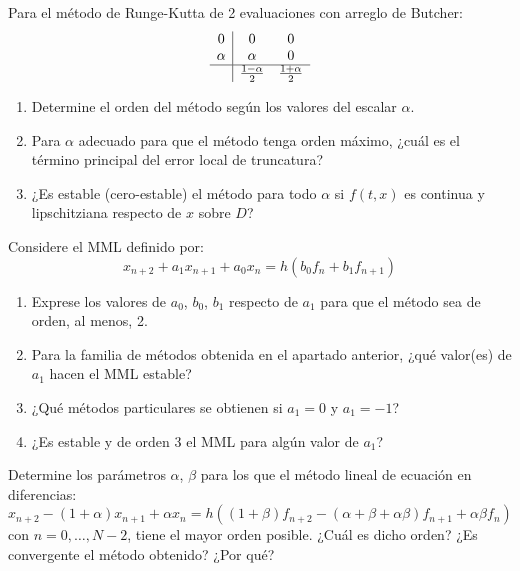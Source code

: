 \begin{ejercicio}\label{ej:3.1.10}
    Para el método de Runge-Kutta de 2 evaluaciones con arreglo de Butcher:
    \begin{equation*}
        \begin{array}{c|cc}
            0 & 0 & 0 \\ 
            \alpha & \alpha & 0 \\ \hline
             & \frac{1-\alpha}{2} & \frac{1+\alpha}{2}
        \end{array}
    \end{equation*}
    \begin{enumerate}
        \item Determine el orden del método según los valores del escalar $\alpha$.
        \item Para $\alpha$ adecuado para que el método tenga orden máximo, ¿cuál es el término principal del error local de truncatura?
        \item ¿Es estable (cero-estable) el método para todo $\alpha$ si $f(t, x)$ es continua y lipschitziana respecto de $x$ sobre $D$?
    \end{enumerate}
\end{ejercicio}

\begin{ejercicio}
    Considere el MML definido por:
    \begin{equation*}
        x_{n+2} + a_1 x_{n+1} + a_0 x_n = h (b_0 f_n + b_1 f_{n+1})
    \end{equation*}
    \begin{enumerate}
        \item Exprese los valores de $a_0$, $b_0$, $b_1$ respecto de $a_1$ para que el método sea de orden, al menos, 2.
        \item Para la familia de métodos obtenida en el apartado anterior, ¿qué valor(es) de $a_1$ hacen el MML estable?
        \item ¿Qué métodos particulares se obtienen si $a_1 = 0$ y $a_1 = -1$?
        \item ¿Es estable y de orden 3 el MML para algún valor de $a_1$?
    \end{enumerate}
\end{ejercicio}

\begin{ejercicio}\label{ej:3.1.12}
    Determine los parámetros $\alpha$, $\beta$ para los que el método lineal de ecuación en diferencias:
    \begin{equation*}
        x_{n+2} - (1 + \alpha) x_{n+1} + \alpha x_n = h ((1 + \beta) f_{n+2} - (\alpha + \beta + \alpha \beta) f_{n+1} + \alpha \beta f_n)
    \end{equation*}
    con $n = 0, \ldots, N-2$, tiene el mayor orden posible. ¿Cuál es dicho orden? ¿Es convergente el método obtenido? ¿Por qué?
\end{ejercicio}

